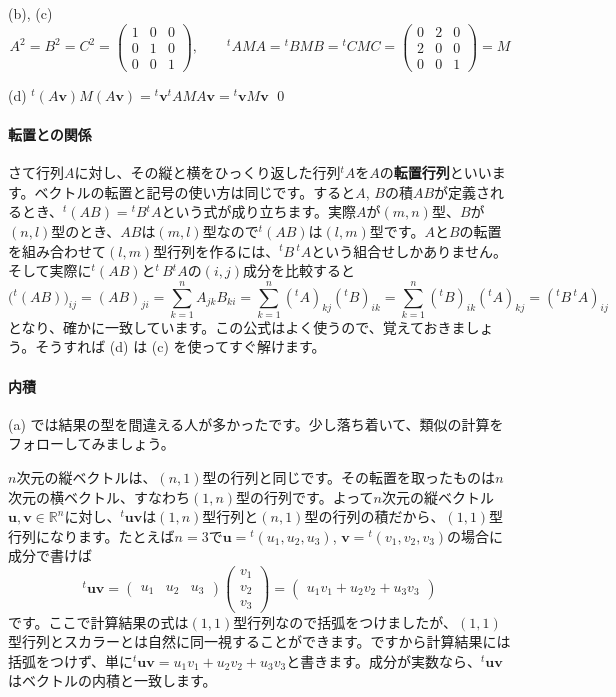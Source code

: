 \noindent (b), (c)
\[
A^2 = 
B^2 = 
C^2 = 
\begin{pmatrix}
1 & 0 & 0 \\
0 & 1 & 0 \\
0 & 0 & 1
\end{pmatrix}
, \qquad
{}^t AMA = 
{}^t BMB = 
{}^t CMC =
\begin{pmatrix}
0 & 2 & 0 \\
2 & 0 & 0 \\
0 & 0 & 1
\end{pmatrix}
= M
\]

\noindent(d) ${}^t(A\bm{v})M(A\bm{v}) = {}^t\bm{v}{}^t \! AMA\bm{v} = {}^t\bm{v}M\bm{v}$ \qed


\paragraph{転置との関係}

さて行列$A$に対し、その縦と横をひっくり返した行列${}^t\! A$を$A$の\textbf{転置行列}といいます。ベクトルの転置と記号の使い方は同じです。すると$A$, $B$の積$AB$が定義されるとき、${}^t(AB) = {}^t B {}^t\!A$という式が成り立ちます。実際$A$が$(m, n)$型、$B$が$(n, l)$型のとき、$AB$は$(m, l)$型なので${}^t(AB)$は$(l, m)$型です。$A$と$B$の転置を組み合わせて$(l, m)$型行列を作るには、${}^tB\, {}^t\! A$という組合せしかありません。そして実際に${}^t(AB)$と${}^t\, B{}^t\! A$の$(i, j)$成分を比較すると
\[
\bigl({}^t(AB)\bigr)_{ij} = (AB)_{ji} = \sum_{k = 1}^n A_{jk} B_{ki} = \sum_{k = 1}^n ({}^t\! A)_{kj} ({}^t B)_{ik}
= \sum_{k = 1}^n ({}^t B)_{ik} ({}^t\! A)_{kj} = ({}^t B\, {}^t\! A)_{ij}
\]
となり、確かに一致しています。この公式はよく使うので、覚えておきましょう。そうすれば (d) は (c) を使ってすぐ解けます。

\paragraph{内積}

(a) では結果の型を間違える人が多かったです。少し落ち着いて、類似の計算をフォローしてみましょう。

$n$次元の縦ベクトルは、$(n,1)$型の行列と同じです。その転置を取ったものは$n$次元の横ベクトル、すなわち$(1,n)$型の行列です。よって$n$次元の縦ベクトル$\bm{u},\bm{v}\in\mathbb{R}^n$に対し、${}^t\bm{u}\bm{v}$は$(1,n)$型行列と$(n,1)$型の行列の積だから、$(1,1)$型行列になります。たとえば$n=3$で$\bm{u} = {}^t(u_1, u_2, u_3)$, $\bm{v} = {}^t(v_1, v_2, v_3)$の場合に成分で書けば
\[
{}^t \bm{u}\bm{v}
=
\begin{pmatrix}
u_1 & u_2 & u_3
\end{pmatrix}
\begin{pmatrix}
v_1 \\
v_2 \\
v_3
\end{pmatrix}
=
\begin{pmatrix}
u_1 v_1 + u_2 v_2 + u_3 v_3
\end{pmatrix}
\]
です。ここで計算結果の式は$(1, 1)$型行列なので括弧をつけましたが、$(1, 1)$型行列とスカラーとは自然に同一視することができます。ですから計算結果には括弧をつけず、単に${}^t\bm{u}\bm{v} = u_1 v_1 + u_2 v_2 + u_3 v_3$と書きます。成分が実数なら、${}^t\bm{u}\bm{v}$はベクトルの内積と一致します。

